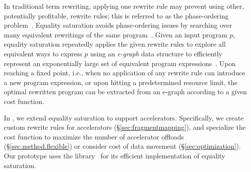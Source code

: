 In traditional term rewriting,
  applying one rewrite rule
  may prevent
  using other, potentially profitable, rewrite rules;
  this is referred to as the phase-ordering problem~\cite{whitfield1997approach}.
Equality saturation avoids
  phase-ordering issues %
  by searching over many equivalent rewritings of the same program~\cite{tate2011equality,joshi2002denali}.
Given an input program $p$, 
  equality saturation repeatedly applies 
  the given rewrite rules 
  to explore all equivalent ways to express $p$
using an \textit{e-graph} data structure
  to efficiently represent an exponentially large set of equivalent program expressions~\cite{nelson1980fast,nieuwenhuis2005proof}.
Upon reaching a fixed point, 
  i.e., when no application of any rewrite rule can introduce a new program expression,
  or upon hitting a predetermined resource limit,
  the optimal rewritten program
  can be extracted from an e-graph
  according to a given cost function.

In {\TLA}, we extend equality saturation to support accelerators. 
Specifically, we
 create custom rewrite rules for accelerators (\S\ref{sec:fragmentmapping}), 
and specialize the cost function to maximize the number of accelerator offloads (\S\ref{sec.method.flexible}) or 
consider cost of data movement (\S\ref{sec:optimization}).
  Our prototype uses
  the \egg library~\cite{willsey2021egg} for its
  efficient implementation of equality saturation.